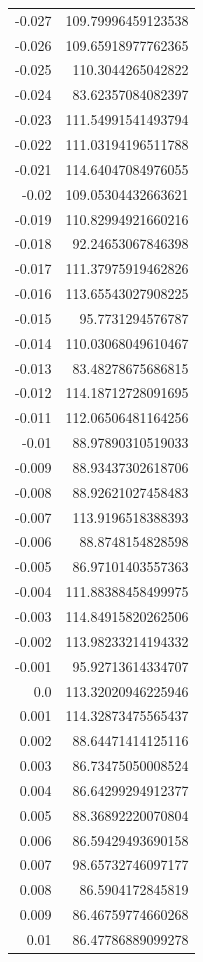 \documentclass{mimosis}
\begin{document}
\begin{longtable}{rr}
-0.027 & 109.79996459123538\\
-0.026 & 109.65918977762365\\
-0.025 & 110.3044265042822\\
-0.024 & 83.62357084082397\\
-0.023 & 111.54991541493794\\
-0.022 & 111.03194196511788\\
-0.021 & 114.64047084976055\\
-0.02 & 109.05304432663621\\
-0.019 & 110.82994921660216\\
-0.018 & 92.24653067846398\\
-0.017 & 111.37975919462826\\
-0.016 & 113.65543027908225\\
-0.015 & 95.7731294576787\\
-0.014 & 110.03068049610467\\
-0.013 & 83.48278675686815\\
-0.012 & 114.18712728091695\\
-0.011 & 112.06506481164256\\
-0.01 & 88.97890310519033\\
-0.009 & 88.93437302618706\\
-0.008 & 88.92621027458483\\
-0.007 & 113.9196518388393\\
-0.006 & 88.8748154828598\\
-0.005 & 86.97101403557363\\
-0.004 & 111.88388458499975\\
-0.003 & 114.84915820262506\\
-0.002 & 113.98233214194332\\
-0.001 & 95.92713614334707\\
0.0 & 113.32020946225946\\
0.001 & 114.32873475565437\\
0.002 & 88.64471414125116\\
0.003 & 86.73475050008524\\
0.004 & 86.64299294912377\\
0.005 & 88.36892220070804\\
0.006 & 86.59429493690158\\
0.007 & 98.65732746097177\\
0.008 & 86.5904172845819\\
0.009 & 86.46759774660268\\
0.01 & 86.47786889099278\\

\end{longtable}
\end{document}
